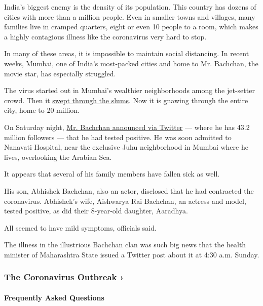 India's biggest enemy is the density of its population. This country has
dozens of cities with more than a million people. Even in smaller towns
and villages, many families live in cramped quarters, eight or even 10
people to a room, which makes a highly contagious illness like the
coronavirus very hard to stop.

In many of these areas, it is impossible to maintain social distancing.
In recent weeks, Mumbai, one of India's most-packed cities and home to
Mr. Bachchan, the movie star, has especially struggled.

The virus started out in Mumbai's wealthier neighborhoods among the
jet-setter crowd. Then it
\href{https://www.nytimes.com/2020/05/14/world/asia/mumbai-lockdown-coronavirus.html}{swept
through the slums}. Now it is gnawing through the entire city, home to
20 million.

On Saturday night,
\href{https://twitter.com/SrBachchan/status/1282002456063295490}{Mr.
Bachchan announced via Twitter} --- where he has 43.2 million followers
--- that he had tested positive. He was soon admitted to Nanavati
Hospital, near the exclusive Juhu neighborhood in Mumbai where he lives,
overlooking the Arabian Sea.

It appears that several of his family members have fallen sick as well.

His son, Abhishek Bachchan, also an actor, disclosed that he had
contracted the coronavirus. Abhishek's wife, Aishwarya Rai Bachchan, an
actress and model, tested positive, as did their 8-year-old daughter,
Aaradhya.

All seemed to have mild symptoms, officials said.

The illness in the illustrious Bachchan clan was such big news that the
health minister of Maharashtra State issued a Twitter post about it at
4:30 a.m. Sunday.

\href{https://www.nytimes.com/news-event/coronavirus?action=click\&pgtype=Article\&state=default\&region=MAIN_CONTENT_3\&context=storylines_faq}{}

\hypertarget{the-coronavirus-outbreak-}{%
\subsubsection{The Coronavirus Outbreak
›}\label{the-coronavirus-outbreak-}}

\hypertarget{frequently-asked-questions}{%
\paragraph{Frequently Asked
Questions}\label{frequently-asked-questions}}


